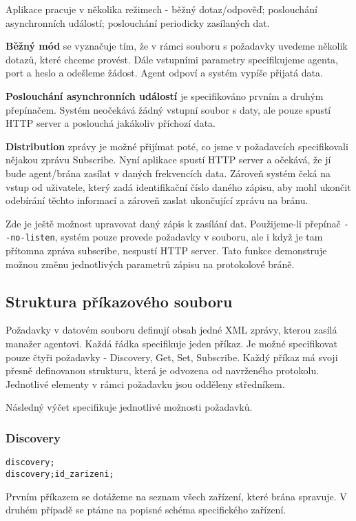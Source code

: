 Aplikace pracuje v několika režimech - běžný dotaz/odpověď; poslouchání asynchronních událostí; poslouchání periodicky
zasílaných dat.

\textbf{Běžný mód} se vyznačuje tím, že v rámci souboru s požadavky uvedeme několik dotazů, které chceme provést. Dále
vstupními parametry specifikujeme agenta, port a heslo a odešleme žádost. Agent odpoví a systém vypíše přijatá data.

\textbf{Poslouchání asynchronních událostí} je specifikováno prvním a druhým přepínačem. Systém neočekává žádný vstupní
soubor s daty, ale pouze spustí HTTP server a poslouchá jakákoliv příchozí data.

\textbf{Distribution} zprávy je možné přijímat poté, co jsme v požadavcích specifikovali nějakou zprávu Subscribe.
Nyní aplikace spustí HTTP server a očekává, že jí bude agent/brána zasílat v daných frekvencích data. Zároveň 
systém čeká na vstup od uživatele, který zadá identifikační číslo daného zápisu, aby mohl ukončit odebírání
těchto informací a zároveň zaslat ukončující zprávu na bránu.

Zde je ještě možnost upravovat daný zápis k zasílání dat. Použijeme-li přepínač \verb|--no-listen|, systém pouze provede
požadavky v souboru, ale i když je tam přítomna zpráva subscribe, nespustí HTTP server. Tato funkce demonstruje možnou změnu
jednotlivých parametrů zápisu na protokolové bráně.

\subsection*{Struktura příkazového souboru}
Požadavky v datovém souboru definují obsah jedné XML zprávy, kterou zasílá manažer agentovi. Každá řádka
specifikuje jeden příkaz. Je možné specifikovat pouze čtyři požadavky - Discovery, Get, Set, Subscribe.
Každý příkaz má svoji přesně definovanou strukturu, která je odvozena od navrženého protokolu. Jednotlivé
elementy v rámci požadavku jsou odděleny středníkem.

Následný výčet specifikuje jednotlivé možnosti požadavků.

\subsubsection*{Discovery}
\begin{verbatim}
discovery;
discovery;id_zarizeni;
\end{verbatim}

Prvním příkazem se dotážeme na seznam všech zařízení, které brána spravuje. V druhém případě se ptáme na popisné schéma specifického
zařízení.

